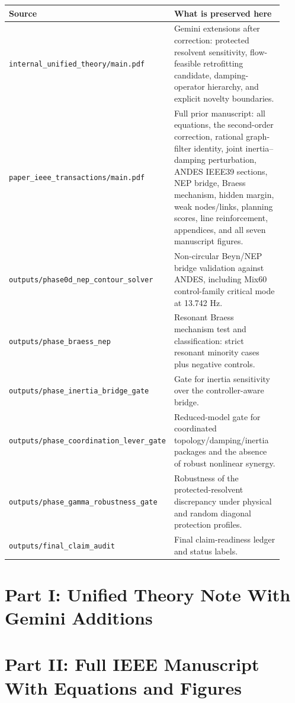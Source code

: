 \documentclass[11pt]{article}
\newcommand{\artifact}[1]{\texttt{#1}}
\begin{document}
\begin{longtable}{p{0.30\linewidth}p{0.62\linewidth}}
\toprule
Source & What is preserved here\\
\midrule
\artifact{internal\_unified\_theory/main.pdf}
& Gemini extensions after correction: protected resolvent sensitivity,
flow-feasible retrofitting candidate, damping-operator hierarchy, and explicit
novelty boundaries.\\
\artifact{paper\_ieee\_transactions/main.pdf}
& Full prior manuscript: all equations, the second-order correction, rational
graph-filter identity, joint inertia--damping perturbation, ANDES IEEE39
sections, NEP bridge, Braess mechanism, hidden margin, weak nodes/links,
planning scores, line reinforcement, appendices, and all seven manuscript
figures.\\
\artifact{outputs/phase0d\_nep\_contour\_solver}
& Non-circular Beyn/NEP bridge validation against ANDES, including Mix60
control-family critical mode at 13.742 Hz.\\
\artifact{outputs/phase\_braess\_nep}
& Resonant Braess mechanism test and classification: strict resonant minority
cases plus negative controls.\\
\artifact{outputs/phase\_inertia\_bridge\_gate}
& Gate for inertia sensitivity over the controller-aware bridge.\\
\artifact{outputs/phase\_coordination\_lever\_gate}
& Reduced-model gate for coordinated topology/damping/inertia packages and the
absence of robust nonlinear synergy.\\
\artifact{outputs/phase\_gamma\_robustness\_gate}
& Robustness of the protected-resolvent discrepancy under physical and random
diagonal protection profiles.\\
\artifact{outputs/final\_claim\_audit}
& Final claim-readiness ledger and status labels.\\
\bottomrule
\end{longtable}

\clearpage
\part*{Part I: Unified Theory Note With Gemini Additions}



\clearpage
\part*{Part II: Full IEEE Manuscript With Equations and Figures}
\end{document}
